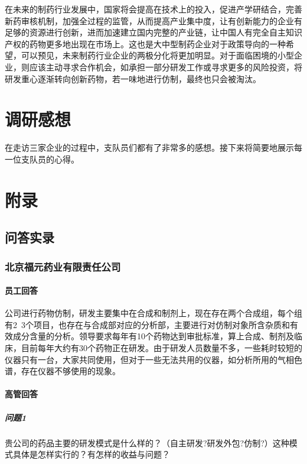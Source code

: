 \documentclass[twocolumn]{ctexbook}
\begin{document}
	在未来的制药行业发展中，国家将会提高在技术上的投入，促进产学研结合，完善新药审核机制，加强全过程的监管，从而提高产业集中度，让有创新能力的企业有足够的资源进行创新，进而加速建立国内完整的产业链，让中国人有完全自主知识产权的药物更多地出现在市场上。这也是大中型制药企业对于政策导向的一种希望，可以预见，未来制药行业企业的两极分化将更加明显。对于面临困境的小型企业，则应该主动寻求合作机会，如承担一部分研发工作或寻求更多的风险投资，将研发重心逐渐转向创新药物，若一味地进行仿制，最终也只会被淘汰。
	
\onecolumn
\backmatter
	
	
\chapter{调研感想}
	在走访三家企业的过程中，支队员们都有了非常多的感想。接下来将简要地展示每一位支队员的心得。
	
	

\chapter{附录}

	\section*{问答实录}
	\subsection*{北京福元药业有限责任公司}
	\subsubsection*{员工回答}公司进行药物仿制，研发主要集中在合成和制剂上，现在存在两个合成组，每个组有2~3个项目，也存在与合成部对应的分析部，主要进行对仿制对象所含杂质和有效成分含量的分析。领导要求每年有10个药物达到审批标准，算上合成、制剂及临床，目前每年大约有30个药物正在研发。由于研发人员数量不多，一些耗时较短的仪器只有一台，大家共同使用，但对于一些无法共用的仪器，如分析所用的气相色谱，存在仪器不够使用的现象。
	
	\subsubsection*{高管回答}
	
	\paragraph{问题1}贵公司的药品主要的研发模式是什么样的？（自主研发?研发外包?仿制?）这种模式具体是怎样实行的？有怎样的收益与问题？
	
\end{document}

